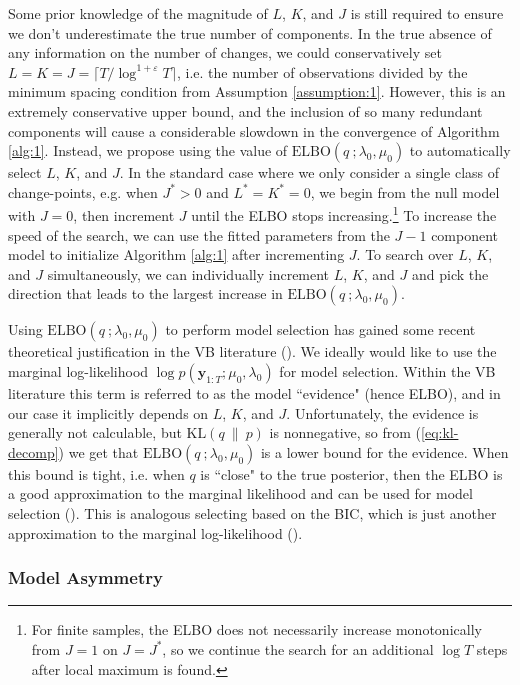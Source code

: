 Some prior knowledge of the magnitude of $L$, $K$, and $J$ is still required to ensure we don't underestimate the true number of components. In the true absence of any information on the number of changes, we could conservatively set $L=K=J=\lceil T /\log^{1+\varepsilon} T \rceil$, i.e. the number of observations divided by the minimum spacing condition from Assumption \ref{assumption:1}. However, this is an extremely conservative upper bound, and the inclusion of so many redundant components will cause a considerable slowdown in the convergence of Algorithm \ref{alg:1}. Instead, we propose using the value of $\text{ELBO}(q\:;\lambda_0, \mu_0)$ to automatically select $L$, $K$, and $J$. In the standard case where we only consider a single class of change-points, e.g. when $J^* > 0$ and $L^*=K^*=0$, we begin from the null model with $J=0$, then increment $J$ until the ELBO stops increasing.\footnote{For finite samples, the ELBO does not necessarily increase monotonically from $J = 1$ on $J = J^*$, so we continue the search for an additional $\log T$ steps after local maximum is found.} To increase the speed of the search, we can use the fitted parameters from the $J-1$ component model to initialize Algorithm \ref{alg:1} after incrementing $J$. To search over $L$, $K$, and $J$ simultaneously, we can individually increment $L$, $K$, and $J$ and pick the direction that leads to the largest increase in $\text{ELBO}(q\:;\lambda_0, \mu_0)$.

Using $\text{ELBO}(q\:;\lambda_0, \mu_0)$ to perform model selection has gained some recent theoretical justification in the VB literature (\citealp{Cherief18, Cherief19}). We ideally would like to use the marginal log-likelihood $\log p(\mathbf{y}_{1:T}; \mu_0,\lambda_0)$ for model selection. Within the VB literature this term is referred to as the model ``evidence" (hence ELBO), and in our case it implicitly depends on  $L$, $K$, and $J$. Unfortunately, the evidence is generally not calculable, but $\text{KL}(q \:\lVert\: p)$ is nonnegative, so from (\ref{eq:kl-decomp}) we get that $\text{ELBO}(q\:;\lambda_0, \mu_0)$ is a lower bound for the evidence. When this bound is tight, i.e. when $q$ is ``close" to the true posterior, then the ELBO is a good approximation to the marginal likelihood and can be used for model selection (\citealp{Blei17}). This is analogous selecting based on the BIC, which is just another approximation to the marginal log-likelihood (\citealp{Schwarz78}).

\subsubsection{Model Asymmetry}

